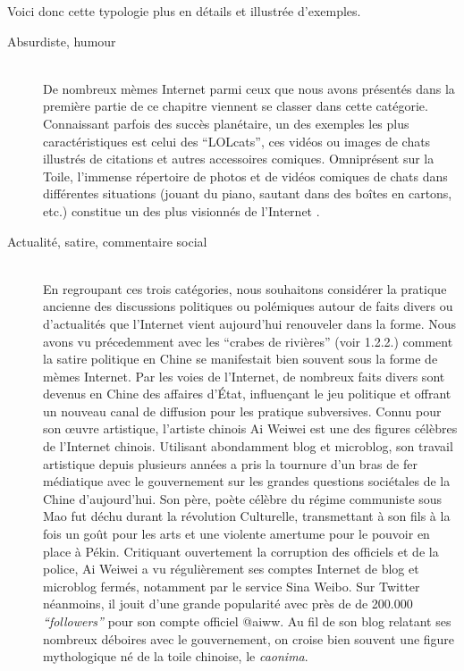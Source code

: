 Voici donc cette typologie plus en d\'etails et illustr\'ee d{\textquoteright}exemples. 


\begin{description}

\item[Absurdiste, humour]
\hfill \\
De nombreux m\`emes Internet parmi ceux que nous avons pr\'esent\'es dans la premi\`ere partie de ce chapitre viennent se classer dans cette cat\'egorie. Connaissant parfois des succ\`es plan\'etaire, un des exemples les plus caract\'eristiques est celui des {\textquotedblleft}LOLcats{\textquotedblright}, ces vid\'eos ou images de chats illustr\'es de citations et autres accessoires comiques. Omnipr\'esent sur la Toile, l{\textquoteright}immense r\'epertoire de photos et de vid\'eos comiques de chats dans diff\'erentes situations (jouant du piano, sautant dans des bo\^ites en cartons, etc.) constitue un des plus visionn\'es de l{\textquoteright}Internet \citep{Bauckhage2011}. 

\item[Actualit\'e, satire, commentaire social]
\hfill \\
En regroupant ces trois cat\'egories, nous souhaitons consid\'erer la pratique ancienne des discussions politiques ou pol\'emiques autour de faits divers ou d{\textquoteright}actualit\'es que l{\textquoteright}Internet vient aujourd{\textquoteright}hui renouveler dans la forme. Nous avons vu pr\'ecedemment avec les {\textquotedblleft}crabes de rivi\`eres{\textquotedblright} (voir 1.2.2.) \textcolor[rgb]{0.0,0.0,0.039215688}{comment la satire politique en Chine se manifestait bien souvent sous la forme de m\`emes Internet. Par les voies de l{\textquoteright}Internet, }de nombreux faits divers sont devenus en Chine des affaires d{\textquoteright}\'Etat, influen\c{c}ant le jeu politique et offrant un nouveau canal de diffusion pour les pratique subversives. Connu pour son {\oe}uvre artistique, l{\textquoteright}artiste chinois Ai Weiwei est une des figures c\'el\`ebres de l{\textquoteright}Internet chinois. Utilisant abondamment blog et microblog, son travail artistique depuis plusieurs ann\'ees a pris la tournure d{\textquoteright}un bras de fer m\'ediatique avec le gouvernement sur les grandes questions soci\'etales de la Chine d{\textquoteright}aujourd{\textquoteright}hui. Son p\`ere, po\`ete c\'el\`ebre du r\'egime communiste sous Mao fut d\'echu durant la r\'evolution Culturelle, transmettant \`a son fils \`a la fois un go\^ut pour les arts et une violente amertume pour le pouvoir en place \`a P\'ekin. Critiquant ouvertement la corruption des officiels et de la police, Ai Weiwei a vu r\'eguli\`erement ses comptes Internet de blog et microblog ferm\'es, notamment par le service Sina Weibo. Sur Twitter n\'eanmoins, il jouit d{\textquoteright}une grande popularit\'e avec pr\`es de de 200.000 \textit{{\textquotedblleft}followers{\textquotedblright}} pour son compte officiel @aiww. Au fil de son blog relatant ses nombreux d\'eboires avec le gouvernement, on croise bien souvent une figure mythologique n\'e de la toile chinoise, le \textit{caonima}.  


\end{description}
